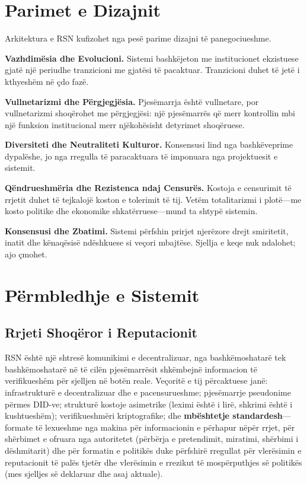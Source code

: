 \documentclass[11pt,a4paper,twocolumn]{article}
\begin{document}
\section{Parimet e Dizajnit}

Arkitektura e RSN kufizohet nga pesë parime dizajni të panegociueshme.

\textbf{Vazhdimësia dhe Evolucioni.} Sistemi bashkëjeton me institucionet ekzistuese gjatë një periudhe tranzicioni me gjatësi të pacaktuar. Tranzicioni duhet të jetë i kthyeshëm në çdo fazë.

\textbf{Vullnetarizmi dhe Përgjegjësia.} Pjesëmarrja është vullnetare, por vullnetarizmi shoqërohet me përgjegjësi: një pjesëmarrës që merr kontrollin mbi një funksion institucional merr njëkohësisht detyrimet shoqëruese.

\textbf{Diversiteti dhe Neutraliteti Kulturor.} Konsensusi lind nga bashkëveprime dypalëshe, jo nga rregulla të paracaktuara të imponuara nga projektuesit e sistemit.

\textbf{Qëndrueshmëria dhe Rezistenca ndaj Censurës.} Kostoja e censurimit të rrjetit duhet të tejkalojë koston e tolerimit të tij. Vetëm totalitarizmi i plotë---me kosto politike dhe ekonomike shkatërruese---mund ta shtypë sistemin.

\textbf{Konsensusi dhe Zbatimi.} Sistemi përfshin prirjet njerëzore drejt smiritetit, inatit dhe kënaqësisë ndëshkuese si veçori mbajtëse. Sjellja e keqe nuk ndalohet; ajo çmohet.

\section{Përmbledhje e Sistemit}

\subsection{Rrjeti Shoqëror i Reputacionit}

RSN është një shtresë komunikimi e decentralizuar, nga bashkëmoshatarë tek bashkëmoshatarë në të cilën pjesëmarrësit shkëmbejnë informacion të verifikueshëm për sjelljen në botën reale. Veçoritë e tij përcaktuese janë: infrastrukturë e decentralizuar dhe e pacensurueshme; pjesëmarrje pseudonime përmes DID-ve; strukturë kostoje asimetrike (leximi është i lirë, shkrimi është i kushtueshëm); verifikueshmëri kriptografike; dhe \textbf{mbështetje standardesh}---formate të lexueshme nga makina për informacionin e përhapur nëpër rrjet, për shërbimet e ofruara nga autoritetet (përbërja e pretendimit, miratimi, shërbimi i dëshmitarit) dhe për formatin e politikës duke përfshirë rregullat për vlerësimin e reputacionit të palës tjetër dhe vlerësimin e rrezikut të mospërputhjes së politikës (mes sjelljes së deklaruar dhe asaj aktuale).
\end{document}
